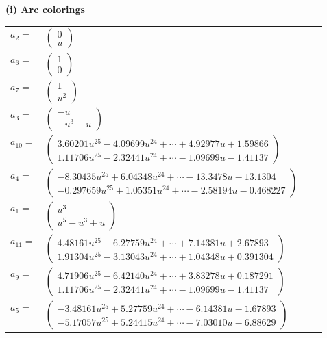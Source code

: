 \documentclass[1p]{elsarticle_modified}
\theoremstyle{definition}
\begin{document}
\flushleft \textbf{(i) Arc colorings}\\
\begin{tabular}{m{7pt} m{180pt} m{7pt} m{180pt} }
\flushright $a_{2}=$&$\begin{pmatrix}0\\u\end{pmatrix}$ \\
\flushright $a_{6}=$&$\begin{pmatrix}1\\0\end{pmatrix}$ \\
\flushright $a_{7}=$&$\begin{pmatrix}1\\u^2\end{pmatrix}$ \\
\flushright $a_{3}=$&$\begin{pmatrix}- u\\- u^3+u\end{pmatrix}$ \\
\flushright $a_{10}=$&$\begin{pmatrix}3.60201 u^{25}-4.09699 u^{24}+\cdots+4.92977 u+1.59866\\1.11706 u^{25}-2.32441 u^{24}+\cdots-1.09699 u-1.41137\end{pmatrix}$ \\
\flushright $a_{4}=$&$\begin{pmatrix}-8.30435 u^{25}+6.04348 u^{24}+\cdots-13.3478 u-13.1304\\-0.297659 u^{25}+1.05351 u^{24}+\cdots-2.58194 u-0.468227\end{pmatrix}$ \\
\flushright $a_{1}=$&$\begin{pmatrix}u^3\\u^5- u^3+u\end{pmatrix}$ \\
\flushright $a_{11}=$&$\begin{pmatrix}4.48161 u^{25}-6.27759 u^{24}+\cdots+7.14381 u+2.67893\\1.91304 u^{25}-3.13043 u^{24}+\cdots+1.04348 u+0.391304\end{pmatrix}$ \\
\flushright $a_{9}=$&$\begin{pmatrix}4.71906 u^{25}-6.42140 u^{24}+\cdots+3.83278 u+0.187291\\1.11706 u^{25}-2.32441 u^{24}+\cdots-1.09699 u-1.41137\end{pmatrix}$ \\
\flushright $a_{5}=$&$\begin{pmatrix}-3.48161 u^{25}+5.27759 u^{24}+\cdots-6.14381 u-1.67893\\-5.17057 u^{25}+5.24415 u^{24}+\cdots-7.03010 u-6.88629\end{pmatrix}$ \\

\end{tabular}
\end{document}
